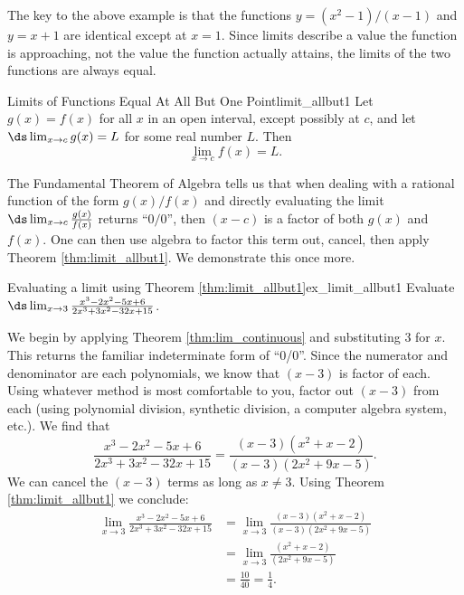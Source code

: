 The key to the above example is that the functions $y=(x^2-1)/(x-1)$ and $y=x+1$ are identical except at $x=1$. Since limits describe a value the function is approaching, not the value the function actually attains, the limits of the two functions are always equal.

\begin{theorem}{Limits of Functions Equal At All But One Point}{limit_allbut1}
{Let $g(x) = f(x)$ for all $x$ in an open interval, except possibly at $c$, and let $\ds \lim_{x\to c} g(x) = L$ for some real number $L$. Then $$\lim_{x\to c}f(x) = L.$$}
\end{theorem}

The Fundamental Theorem of Algebra tells us that when dealing with a rational function of the form $g(x)/f(x)$ and directly evaluating the limit $\ds \lim_{x\to c} \frac{g(x)}{f(x)}$ returns ``$ 0/0 $'', %
then $(x-c)$ is a factor of both $g(x)$ and $f(x)$. One can then use algebra to factor this term out, cancel, then apply Theorem \ref{thm:limit_allbut1}. We demonstrate this once more.\\

\begin{example}{Evaluating a limit using Theorem \ref{thm:limit_allbut1}}{ex_limit_allbut1}
{Evaluate $\ds \lim_{x\to 3} \frac{x^3-2 x^2-5 x+6}{2 x^3+3 x^2-32 x+15}$.}
\end{example}


\begin{solution}
{We begin by applying Theorem \ref{thm:lim_continuous} and substituting 3 for $x$. This returns the familiar indeterminate form of ``0/0''. %
Since the numerator and denominator are each polynomials, we know that $(x-3)$ is factor of each. Using whatever method is most comfortable to you, factor out $(x-3)$ from each (using polynomial division, synthetic division, a computer algebra system, etc.). We find that $$\frac{x^3-2 x^2-5 x+6}{2 x^3+3 x^2-32 x+15} = \frac{(x-3)(x^2+x-2)}{(x-3)(2 x^2+9 x-5)}.$$ We can cancel the $(x-3)$ terms as long as $x\neq 3$. Using Theorem \ref{thm:limit_allbut1} we conclude:
		\begin{align*}
		\lim_{x\to 3} \frac{x^3-2 x^2-5 x+6}{2 x^3+3 x^2-32 x+15} &= \lim_{x\to 3}\frac{(x-3)(x^2+x-2)}{(x-3)(2 x^2+9 x-5)} \\
																															&=	\lim_{x\to 3} \frac{(x^2+x-2)}{(2 x^2+9 x-5)}\\
																															&= \frac{10}{40} = \frac14.
		\end{align*}
}
\end{solution}

